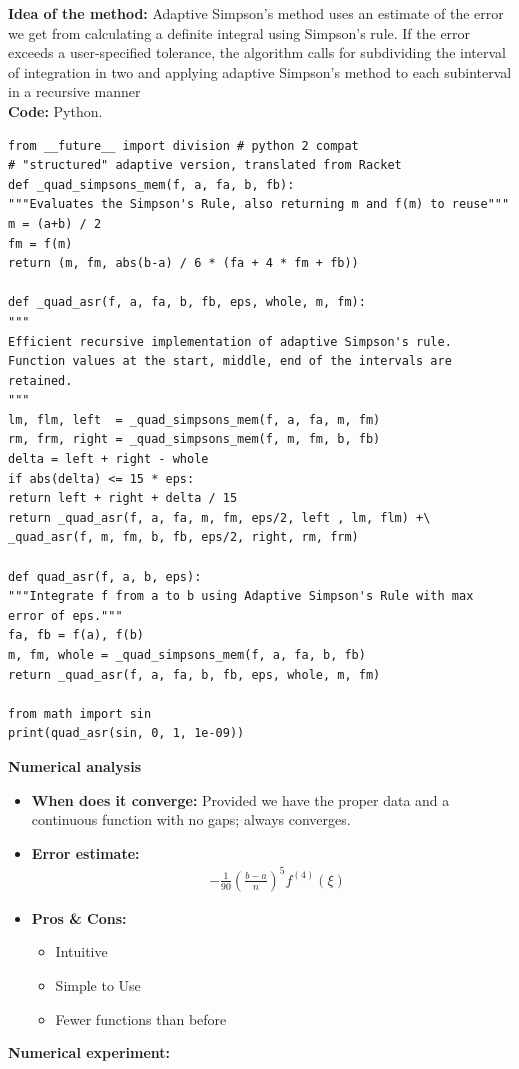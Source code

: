 \documentclass{article}
\begin{document}
{\bf Idea of the method:} 
 Adaptive Simpson's method uses an estimate of the error we get from calculating a definite integral using Simpson's rule. If the error exceeds a user-specified tolerance, the algorithm calls for subdividing the interval of integration in two and applying adaptive Simpson's method to each subinterval in a recursive manner
{\\\bf Code:}
Python.
\begin{verbatim}
from __future__ import division # python 2 compat
# "structured" adaptive version, translated from Racket
def _quad_simpsons_mem(f, a, fa, b, fb):
"""Evaluates the Simpson's Rule, also returning m and f(m) to reuse"""
m = (a+b) / 2
fm = f(m)
return (m, fm, abs(b-a) / 6 * (fa + 4 * fm + fb))

def _quad_asr(f, a, fa, b, fb, eps, whole, m, fm):
"""
Efficient recursive implementation of adaptive Simpson's rule.
Function values at the start, middle, end of the intervals are retained.
"""
lm, flm, left  = _quad_simpsons_mem(f, a, fa, m, fm)
rm, frm, right = _quad_simpsons_mem(f, m, fm, b, fb)
delta = left + right - whole
if abs(delta) <= 15 * eps:
return left + right + delta / 15
return _quad_asr(f, a, fa, m, fm, eps/2, left , lm, flm) +\
_quad_asr(f, m, fm, b, fb, eps/2, right, rm, frm)

def quad_asr(f, a, b, eps):
"""Integrate f from a to b using Adaptive Simpson's Rule with max error of eps."""
fa, fb = f(a), f(b)
m, fm, whole = _quad_simpsons_mem(f, a, fa, b, fb)
return _quad_asr(f, a, fa, b, fb, eps, whole, m, fm)

from math import sin
print(quad_asr(sin, 0, 1, 1e-09))
\end{verbatim}
{\bf Numerical analysis}
\begin{itemize}
	\item{\bf When does it converge:} Provided we have the proper data and a continuous function with no gaps; always converges.
	\item {\bf Error estimate:}
	\begin{equation}
	\begin{split}
&- \frac { 1 } { 90 } \left( \frac { b - a } { n } \right) ^ { 5 } f ^ { ( 4 ) } ( \xi )
	\end{split}
	\end{equation}
	\item {\bf Pros \& Cons:}
	\begin{itemize}
		\item Intuitive
		\item Simple to Use
		\item Fewer functions than before
	\end{itemize}
\end{itemize}
{\bf Numerical experiment:}
\end{document}
